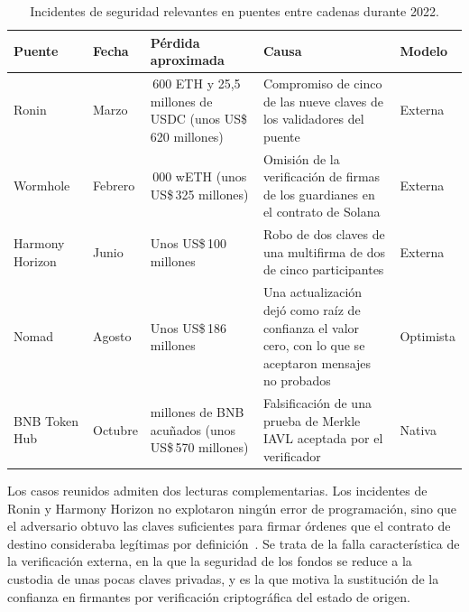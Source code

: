 \begin{table}[htbp]
	\centering
	\caption{Incidentes de seguridad relevantes en puentes entre cadenas durante 2022.}
	\label{tab:puentes_incidentes}
	\small
	\begin{tabular}{>{\raggedright\arraybackslash}p{2.6cm} >{\raggedright\arraybackslash}p{1.5cm} >{\raggedright\arraybackslash}p{2.8cm} >{\raggedright\arraybackslash}p{4.6cm} >{\raggedright\arraybackslash}p{1.8cm}}
		\toprule
		\textbf{Puente} & \textbf{Fecha} & \textbf{Pérdida aproximada} & \textbf{Causa} &
		\textbf{Modelo} \\
		\midrule
		Ronin~\cite{roninpostmortem} & Marzo & 173\,600 ETH y 25,5 millones de USDC (unos US\$\,620
		millones) & Compromiso de cinco de las nueve claves de los validadores del puente & Externa \\
		\addlinespace
		Wormhole~\cite{wormholeincident} & Febrero & 120\,000 wETH (unos US\$\,325 millones) &
		Omisión de la verificación de firmas de los guardianes en el contrato de Solana & Externa \\
		\addlinespace
		Harmony Horizon~\cite{harmonyhorizon} & Junio & Unos US\$\,100 millones & Robo de dos claves
		de una multifirma de dos de cinco participantes & Externa \\
		\addlinespace
		Nomad~\cite{nomadrca} & Agosto & Unos US\$\,186 millones & Una actualización dejó como raíz
		de confianza el valor cero, con lo que se aceptaron mensajes no probados & Optimista \\
		\addlinespace
		BNB Token Hub~\cite{verichainsbnb} & Octubre & 2 millones de BNB acuñados (unos US\$\,570
		millones) & Falsificación de una prueba de Merkle IAVL aceptada por el verificador & Nativa \\
		\bottomrule
	\end{tabular}
\end{table}

Los casos reunidos admiten dos lecturas complementarias. Los incidentes de Ronin y Harmony
Horizon no explotaron ningún error de programación, sino que el adversario obtuvo las claves
suficientes para firmar órdenes que el contrato de destino consideraba legítimas por
definición~\cite{roninpostmortem, harmonyhorizon}. Se trata de la falla característica de la
verificación externa, en la que la seguridad de los fondos se reduce a la custodia de unas pocas
claves privadas, y es la que motiva la sustitución de la confianza en firmantes por verificación
criptográfica del estado de origen.

